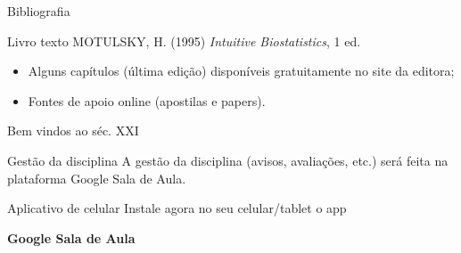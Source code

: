 \documentclass{beamer}
\begin{document}

\begin{frame}{\scriptsize Bibliografia}
  \begin{block}{Livro texto}
    \footnotesize
    MOTULSKY, H. (1995) {\em Intuitive Biostatistics}, 1 ed.
  \end{block}
  \bigskip
  \begin{itemize}
    \scriptsize
  \item Alguns capítulos (última edição) disponíveis gratuitamente no site da editora;
  \item Fontes de apoio online (apostilas e papers).
  \end{itemize}
\end{frame}

\begin{frame}{\scriptsize Bem vindos ao séc. XXI}
  \begin{block}{Gestão da disciplina}
    \footnotesize
    A gestão da disciplina (avisos, avaliações, etc.) será feita na plataforma Google Sala de Aula.
  \end{block}
  \bigskip
  \begin{block}{Aplicativo de celular}
    \footnotesize
    Instale agora no seu celular/tablet o app

    \bigskip
    \centering
    {\bf Google Sala de Aula}
  \end{block}
\end{frame}
\end{document}
